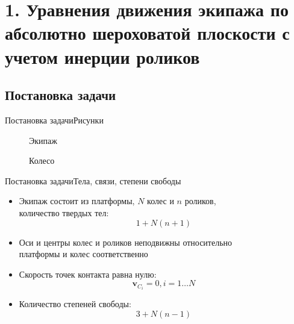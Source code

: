 \documentclass{beamer}
\renewcommand{\vec}[1]{\boldsymbol{\mathbf{#1}}}
\begin{document}
\section{1. Уравнения движения экипажа по абсолютно шероховатой плоскости с учетом инерции роликов}

\subsection{Постановка задачи}

\begin{frame}{Постановка задачи}{Рисунки}
    \begin{figure}
        \centering
            \caption{Экипаж}
        \endminipage
            \caption{Колесо}
        \endminipage
    \end{figure}
\end{frame}

\begin{frame}{Постановка задачи}{Тела, связи, степени свободы}
  \begin{itemize}
  \item {
    Экипаж состоит из платформы, $N$ колес и $n$ роликов,\\
    количество твердых тел:
    $$1 + N(n+1)$$
  }
  \item{
    Оси и центры колес и роликов неподвижны относительно\\
    платформы и колес соответственно
  }
  \item {
    Скорость точек контакта равна нулю:
    $$\vec{v}_{C_i} = 0, i = 1\dots N$$
  }
  \item{
    Количество степеней свободы:
    $$3 + N(n-1)$$
  }

  \end{itemize}
\end{frame}
\end{document}
